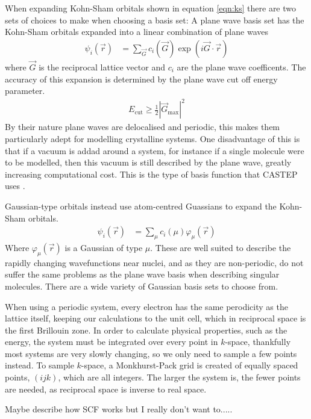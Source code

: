 \documentclass[10pt,a4paper,twocolumn,twoside]{extarticle}
\begin{document}
When expanding Kohn-Sham orbitals shown in equation \ref{eqn:ks} there are two sets of choices to make when choosing a basis set:  A plane wave basis set has the Kohn-Sham orbitals expanded into a linear combination of plane waves 
\begin{align*}
		\psi_i(\vec{r}) &= \sum_{\vec{G}} c_i(\vec{G}) \exp(i\vec{G}\cdot\vec{r})
\end{align*}
where $\vec{G}$ is the reciprocal lattice vector and $c_i$ are the plane wave coefficents. The accuracy of this expansion is determined by the plane wave cut off energy parameter.
\begin{align*}
	E_\text{cut} \geq \frac{1}{2}|{\vec{G}_\text{max}}|^2
\end{align*}
By their nature plane waves are delocalised and periodic, this makes them particularly adept for modelling crystalline systems. One disadvantage of this is that if a vacuum is addad around a system, for instance if a single molecule were to be modelled, then this vacuum is still described by the plane wave, greatly increasing computational cost. This is the type of basis function that CASTEP uses \cite{CASTEP}.

Gaussian-type orbitals instead use atom-centred Guassians to expand the Kohn-Sham orbitals. 
\begin{align*}
	\psi_i(\vec{r}) &= \sum_{\mu} c_i(\mu) \varphi_\mu(\vec{r})
\end{align*}
Where $\varphi_\mu(\vec{r})$ is a Gaussian of type $\mu$. These are well suited to describe the rapidly changing wavefunctions near nuclei, and as they are non-periodic, do not suffer the same problems as the plane wave basis when describing singular molecules. There are a wide variety of Gaussian basis sets to choose from.

When using a periodic system, every electron has the same perodicity as the lattice itself, keeping our calculations to the unit cell, which in reciprocal space is the first Brillouin zone. In order to calculate physical properties, such as the energy, the system must be integrated over every point in $k$-space, thankfully most systems are very slowly changing, so we only need to sample a few points instead. To sample $k$-space, a Monkhurst-Pack grid is created of equally spaced points, $(ijk)$, which are all integers. The larger the system is, the fewer points are needed, as reciprocal space is inverse to real space.


Maybe describe how SCF works but I really don't want to.....
\end{document}
